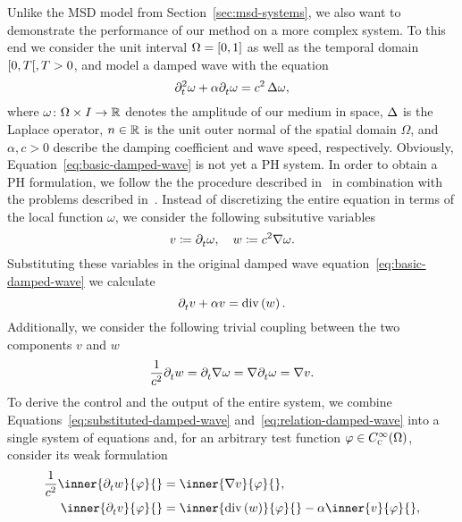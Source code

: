 Unlike the \ac{MSD} model from Section~\ref{sec:msd-systems}, we also want to demonstrate the performance of our method on a more complex system.
To this end we consider the unit interval $\Omega = \interval{0}{1}$ as well as the temporal domain $\interval[open right]{0}{T}, T > 0$, and model a damped wave with the equation
\begin{equation}\label{eq:basic-damped-wave}
    \pd[t]{2} \omega + \alpha \pd[t]{} \omega = c^2 \lapl[\omega],
\end{equation}
where $\omega \colon \Omega \times I \to \bb{R}$ denotes the amplitude of our medium in space, $\lapl$ is the Laplace operator, $n \in \bb{R}$ is the unit outer normal of the spatial domain $\Omega$, and $\alpha, c > 0$ describe the damping coefficient and wave speed, respectively.
Obviously, Equation~\eqref{eq:basic-damped-wave} is not yet a \ac{PH} system.
In order to obtain a \ac{PH} formulation, we follow the the procedure described in~\cite{Serhani2019_2, HMS2022} in combination with the problems described in~\cite{Brugnoli2021, Poussot2023}.
Instead of discretizing the entire equation in terms of the local function $\omega$, we consider the following subsitutive variables
\begin{equation*}
    v \coloneqq \pd[t]{} \omega,\quad w \coloneqq c^2 \nabla \omega.
\end{equation*}
Substituting these variables in the original damped wave equation~\eqref{eq:basic-damped-wave} we calculate
\begin{equation}\label{eq:substituted-damped-wave}
    \pd[t]{} v + \alpha v = \dvg{w}.
\end{equation}
Additionally, we consider the following trivial coupling between the two components $v$ and $w$
\begin{equation}\label{eq:relation-damped-wave}
    \frac{1}{c^2} \pd[t]{} w = \pd[t]{} \nabla \omega = \nabla \pd[t]{} \omega = \nabla v.
\end{equation}
To derive the control and the output of the entire system, we combine Equations~\eqref{eq:substituted-damped-wave} and~\eqref{eq:relation-damped-wave} into a single system of equations and, for an arbitrary test function $\varphi \in C_\msc{c}^\infty(\Omega)$, consider its weak formulation
\begin{equation*}
    \begin{aligned}
        \frac{1}{c^2} \inner{\pd[t]{} w}{\varphi}{} &= \inner{\nabla v}{\varphi}{}, \\
        \inner{\pd[t]{} v}{\varphi}{} &= \inner{\dvg{w}}{\varphi}{} - \alpha \inner{v}{\varphi}{},
    \end{aligned}
\end{equation*}
